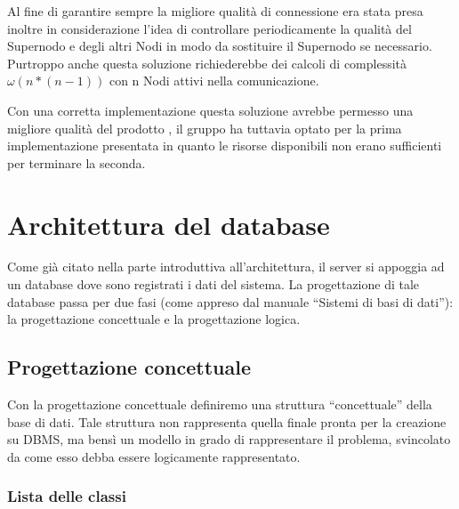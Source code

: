 Al fine di garantire sempre la migliore qualità di connessione era stata presa inoltre in considerazione l'idea di controllare periodicamente la qualità del Supernodo e degli altri Nodi in modo da sostituire il Supernodo se necessario. Purtroppo anche questa soluzione richiederebbe dei calcoli di complessità $\omega(n*(n-1))$ con n Nodi attivi nella comunicazione.

Con una corretta implementazione questa soluzione avrebbe permesso una migliore qualità del prodotto \caName, il gruppo ha tuttavia optato per la prima implementazione presentata in quanto le risorse disponibili non erano sufficienti per terminare la seconda.
\clearpage

\section{Architettura del database}\label{sec:database}

Come già citato nella parte introduttiva all'architettura, il server si appoggia ad un database dove sono registrati i dati del sistema. La progettazione di tale database passa per due fasi (come appreso dal manuale ``Sistemi di basi di dati''): la progettazione concettuale e la progettazione logica.

\subsection{Progettazione concettuale}
Con la progettazione concettuale definiremo una struttura ``concettuale'' della base di dati. Tale struttura non rappresenta quella finale pronta per la creazione su DBMS, ma bensì un modello in grado di rappresentare il problema, svincolato da come esso debba essere logicamente rappresentato.

\subsubsection{Lista delle classi}

